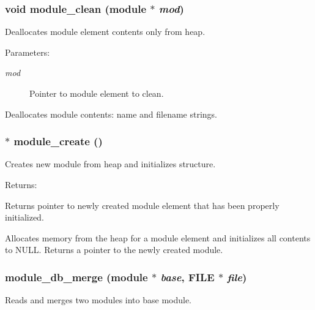 \subsubsection{\setlength{\rightskip}{0pt plus 5cm}void module\_\-clean ({\bf module} $\ast$ {\em mod})}\label{module_8h_a7}


Deallocates module element contents only from heap.

\begin{Desc}
\item[Parameters: ]\par
\begin{description}
\item[{\em 
mod}]Pointer to module element to clean.\end{description}
\end{Desc}
Deallocates module contents: name and filename strings. 
\subsubsection{$\ast$ module\_\-create ()}\label{module_8h_a1}


Creates new module from heap and initializes structure.

\begin{Desc}
\item[Returns: ]\par
Returns pointer to newly created module element that has been properly initialized.\end{Desc}
Allocates memory from the heap for a module element and initializes all contents to NULL. Returns a pointer to the newly created module. 
\subsubsection{ module\_\-db\_\-merge ({\bf module} $\ast$ {\em base}, FILE $\ast$ {\em file})}\label{module_8h_a4}


Reads and merges two modules into base module.

